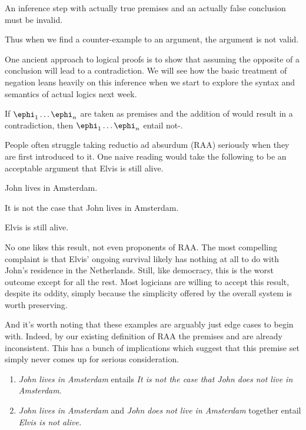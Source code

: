 \begin{definition}
  \label{def:invalidity-principle}
  An inference step with actually true premises and an actually false conclusion
  must be invalid.  
\end{definition}

Thus when we find a counter-example to an argument, the argument is not valid.

One ancient approach to logical proofs is to show that assuming the opposite of
a conclusion will lead to a contradiction. We will see how the basic treatment
of negation leans heavily on this inference when we start to explore the syntax
and semantics of actual logics next week.

\begin{definition}
  \label{def:raa}
  If $\ephi_1\dots\ephi_n$ are taken as premises and the addition of \epsi would
  result in a contradiction, then $\ephi_1\dots\ephi_n$ entail not-\epsi.
\end{definition}

People often struggle taking reductio ad absurdum (RAA) seriously when they are
first introduced to it. One naive reading would take the following to be an
acceptable argument that Elvis is still alive.

\begin{argument}
  \item[ ] John lives in Amsterdam.
  \item[ ] It is not the case that John lives in Amsterdam.
  \item[\therefore] Elvis is still alive.
\end{argument}

No one likes this result, not even proponents of RAA. The most compelling
complaint is that Elvis' ongoing survival likely has nothing at all to do with
John's residence in the Netherlands. Still, like democracy, this is the worst
outcome except for all the rest. Most logicians are willing to accept this
result, despite its oddity, simply because the simplicity offered by the
overall system is worth preserving.

And it's worth noting that these examples are arguably just edge cases to begin
with. Indeed, by our existing definition of RAA the premises \ephi and
\enot\ephi are already inconsistent. This has a bunch of implications which
suggest that this premise set simply never comes up for serious consideration.

\begin{enumerate}
\item \emph{John lives in Amsterdam} entails \emph{It is not the case that John
does not live in Amsterdam}.
\item \emph{John lives in Amsterdam} and \emph{John does not live in Amsterdam}
  together entail \emph{Elvis is not alive.}
\end{enumerate}

